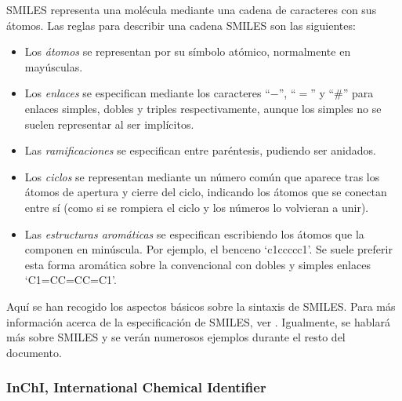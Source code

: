 SMILES representa una molécula mediante una cadena de caracteres con sus átomos. Las reglas para describir una cadena SMILES son las siguientes:
\begin{itemize}
    \item Los \textit{átomos} se representan por su símbolo atómico, normalmente en mayúsculas.
    \item Los \textit{enlaces} se especifican mediante los caracteres ``$-$'', ``$=$'' y ``\#'' para enlaces simples, dobles y triples respectivamente, aunque los simples no se suelen representar al ser implícitos.
    \item Las \textit{ramificaciones} se especifican entre paréntesis, pudiendo ser anidados.
    \item Los \textit{ciclos} se representan mediante un número común que aparece tras los átomos de apertura y cierre del ciclo, indicando los átomos que se conectan entre sí (como si se rompiera el ciclo y los números lo volvieran a unir).
    \item Las \textit{estructuras aromáticas} se especifican escribiendo los átomos que la componen en minúscula. Por ejemplo, el benceno `c1ccccc1'. Se suele preferir esta forma aromática sobre la convencional con dobles y simples enlaces `C1=CC=CC=C1'.
\end{itemize}

Aquí se han recogido los aspectos básicos sobre la sintaxis de SMILES. Para más información acerca de la especificación de SMILES, ver \cite{smiles_tuto, weininger_smiles_1988}. Igualmente, se hablará más sobre SMILES y se verán numerosos ejemplos durante el resto del documento.

\subsubsection{InChI, International Chemical Identifier}

